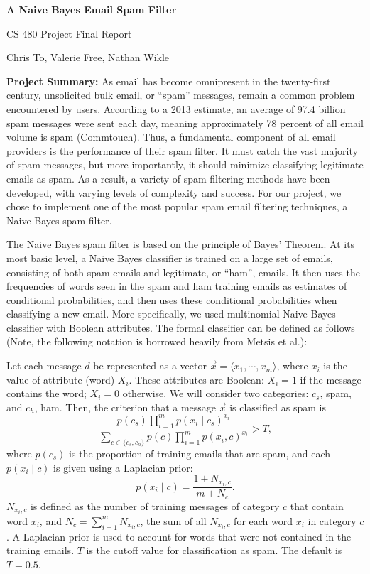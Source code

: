 \documentclass[12pt]{article}
\begin{document}
\begin{center}
{\large \textbf{A Naive Bayes Email Spam Filter}}

CS 480 Project Final Report

Chris To, Valerie Free, Nathan Wikle
\end{center}

\textbf{Project Summary:}  As email has become omnipresent in the twenty-first century, unsolicited
bulk email, or ``spam'' messages, remain a common problem encountered by users.  According to a 2013 estimate, an average of 97.4 billion spam messages were sent each day, meaning approximately
78 percent of all email volume is spam (Commtouch).  Thus, a fundamental component of all email 
providers is the performance of their spam filter.  It must catch the vast majority of spam messages,
but more importantly, it should minimize classifying legitimate emails as spam.  As a result, a variety
of spam filtering methods have been developed, with varying levels of complexity and success.  For our
project, we chose to implement one of the most popular spam email filtering techniques, a Naive Bayes
spam filter.

The Naive Bayes spam filter is based on the principle of Bayes' Theorem.  At its most basic level,
a Naive Bayes classifier is trained on a large set of emails, consisting of both spam emails and 
legitimate, or ``ham'', emails.  It then uses the frequencies of words seen in the spam and ham 
training emails as estimates of conditional probabilities, and then uses these conditional probabilities
when classifying a new email.  More specifically, we used multinomial Naive Bayes classifier with
Boolean attributes.  The formal classifier can be defined as follows (Note, the following notation
is borrowed heavily from Metsis et al.):

Let each message $d$ be represented as a vector $\vec{x} = \big \langle x_1, \cdots, x_m \big \rangle$,
where $x_i$ is the value of attribute (word) $X_i$.  These attributes are Boolean: $X_i = 1$ if the
 message contains the word; $X_i = 0$ otherwise.  We will consider two categories: $c_s$, spam,
 and $c_h$, ham.  Then, the criterion that a message $\vec{x}$ is classified as spam is
 \begin{equation}
 \frac{p(c_s) \prod_{i=1}^{m}p(x_i \mid c_s)^{x_i}}{\sum_{c \in \{c_s,c_h\}}p(c) 
 \prod_{i=1}^{m} p(x_i,c)^{x_i}} > T,
 \end{equation}
 where $p(c_s)$ is the proportion of training emails that are spam, and each $p(x_i \mid c)$ is
  given using a Laplacian prior:
 \begin{equation*}
 p(x_i \mid c) = \frac{1 + N_{x_i,c}}{m + N_c}.
 \end{equation*}
 $N_{x_i,c}$ is defined as the number of training messages of category $c$ that contain word $x_i$,
 and $N_c = \sum_{i=1}^{m} N_{x_i,c}$, the sum of all $N_{x_i,c}$ for each word $x_i$ in
 category $c$.  A Laplacian prior is used to account for words that were not contained in the training
 emails.  $T$ is the cutoff value for classification as spam.  The default is $T = 0.5$.
 
\end{document}
